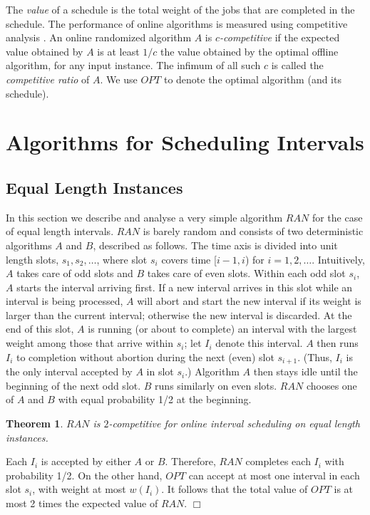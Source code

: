 \documentclass[11pt]{article}
\newtheorem{theorem}{Theorem}[section]
\newcommand{\qed}{\hspace*{\fill}$\Box$\par\medskip}
\newenvironment{proof}{\noindent{\it Proof. }\ignorespaces}{\qed}
\begin{document}
The {\it value} of a schedule is the total weight of the jobs that are 
completed in the schedule.
The performance of online algorithms is measured using
competitive analysis \cite{BorElY98}.  
An online randomized algorithm $A$ is {\it $c$-competitive}
if the expected value obtained by $A$ is at least $1/c$
the value obtained by the optimal offline algorithm, for any input instance.
The infimum of all such $c$ is called the {\it competitive ratio} of $A$.
We use $OPT$ to denote the optimal algorithm (and its schedule).


\section{Algorithms for Scheduling Intervals}

\subsection{Equal Length Instances}

In this section we describe and analyse a very simple algorithm 
$RAN$ for the case of equal length intervals.
$RAN$ is barely random and consists of two 
deterministic algorithms $A$ and $B$, described as follows.  
The time axis is divided into unit length slots, $s_1, s_2, \ldots$,
where slot $s_i$ covers time [$i-1,i$) for $i=1,2,\ldots$.  
Intuitively, $A$ takes care of odd slots and $B$ takes care of even slots.
Within each odd slot $s_i$, $A$ starts the interval arriving first.
If a new interval arrives in this slot while an interval 
is being processed, $A$ will abort and start the new interval 
if its weight is larger than the current interval;
otherwise the new interval is discarded.  
At the end of this slot,
$A$ is running (or about to complete) an interval with the largest weight 
among those that arrive within $s_i$; let $I_i$ denote this interval.
$A$ then runs $I_i$ to completion without abortion during the 
next (even) slot $s_{i+1}$.  
(Thus, $I_i$ is the only interval accepted by $A$ in slot $s_i$.)
Algorithm $A$ then stays idle until the beginning of the next odd slot.
$B$ runs similarly on even slots.
$RAN$ chooses one of $A$ and $B$ with equal probability 1/2 at the beginning.

\begin{theorem}
$RAN$ is $2$-competitive for online interval scheduling on equal length 
instances.
\end{theorem}
\begin{proof}
Each $I_i$ is accepted by either $A$ or $B$.  
Therefore, $RAN$ completes each $I_i$ with probability 1/2. 
On the other hand, $OPT$ can accept
at most one interval in each slot $s_i$,
with weight at most $w(I_i)$.
It follows that the total value of $OPT$ is at most 2 times the
expected value of $RAN$.
\end{proof}
\end{document}
